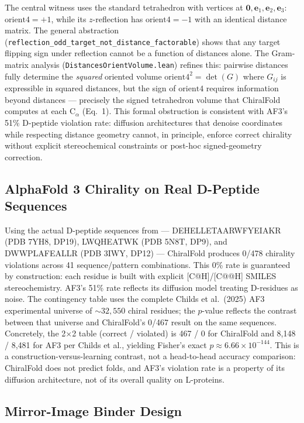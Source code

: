 \documentclass[11pt]{article}
\begin{document}
The central witness uses the standard tetrahedron with vertices at $\mathbf{0}, \mathbf{e}_1, \mathbf{e}_2, \mathbf{e}_3$: $\mathrm{orient4} = +1$, while its $z$-reflection has $\mathrm{orient4} = -1$ with an identical distance matrix. The general abstraction (\texttt{reflection\_odd\_target\_not\_distance\_factorable}) shows that any target flipping sign under reflection cannot be a function of distances alone. The Gram-matrix analysis (\texttt{DistancesOrientVolume.lean}) refines this: pairwise distances fully determine the \emph{squared} oriented volume $\mathrm{orient4}^2 = \det(G)$ where $G_{ij}$ is expressible in squared distances, but the sign of $\mathrm{orient4}$ requires information beyond distances --- precisely the signed tetrahedron volume that ChiralFold computes at each C$_\alpha$ (Eq.~1). This formal obstruction is consistent with AF3's 51\% D-peptide violation rate: diffusion architectures that denoise coordinates while respecting distance geometry cannot, in principle, enforce correct chirality without explicit stereochemical constraints or post-hoc signed-geometry correction.

\subsection{AlphaFold 3 Chirality on Real D-Peptide Sequences}

Using the actual D-peptide sequences from \citet{childs2025} --- DEHELLETAARWFYEIAKR (PDB 7YH8, DP19), LWQHEATWK (PDB 5N8T, DP9), and DWWPLAFEALLR (PDB 3IWY, DP12) --- ChiralFold produces 0/478 chirality violations across 41 sequence/pattern combinations. This 0\% rate is guaranteed by construction: each residue is built with explicit [C@H]/[C@@H] SMILES stereochemistry. AF3's 51\% rate reflects its diffusion model treating D-residues as noise. The contingency table uses the complete Childs et al.\ (2025) AF3 experimental universe of ${\sim}32{,}550$ chiral residues; the $p$-value reflects the contrast between that universe and ChiralFold's 0/467 result on the same sequences. Concretely, the 2$\times$2 table (correct / violated) is 467 / 0 for ChiralFold and 8{,}148 / 8{,}481 for AF3 per Childs et al., yielding Fisher's exact $p \approx 6.66 \times 10^{-144}$. This is a construction-versus-learning contrast, not a head-to-head accuracy comparison: ChiralFold does not predict folds, and AF3's violation rate is a property of its diffusion architecture, not of its overall quality on L-proteins.

\subsection{Mirror-Image Binder Design}
\end{document}

